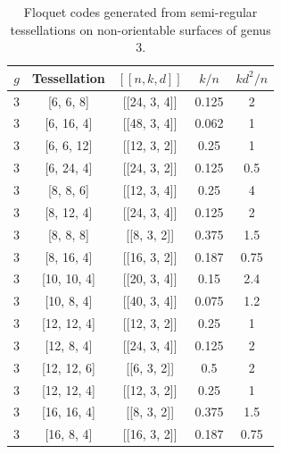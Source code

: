 \documentclass[%
reprint,
amsmath,amssymb,
aps,
]{revtex4-2}
\begin{document}
\begin{table}[b]
	\caption{\label{tab8}
		Floquet codes generated from semi-regular tessellations on non-orientable surfaces of genus $3$.}
	\begin{ruledtabular}
		\begin{tabular}{|c|c|c|c|c|}
			$g$ & Tessellation & $[[n,k,d]]$ & $k/n$ & $kd^{2}/n$ \\ \hline
	3 & [6, 6, 8] & [[24, 3, 4]] & 0.125 & 2  \\
	3 & [6, 16, 4] & [[48, 3, 4]] & 0.062 & 1  \\
	3 & [6, 6, 12] & [[12, 3, 2]] & 0.25 & 1  \\
	3 & [6, 24, 4] & [[24, 3, 2]] & 0.125 & 0.5   \\
	3 & [8, 8, 6] & [[12, 3, 4]] & 0.25 & 4  \\
	3 & [8, 12, 4] & [[24, 3, 4]] & 0.125 & 2  \\
	3 & [8, 8, 8] & [[8, 3, 2]] & 0.375 & 1.5   \\
	3 & [8, 16, 4] & [[16, 3, 2]] & 0.187 & 0.75  \\
	3 & [10, 10, 4] & [[20, 3, 4]] & 0.15 & 2.4  \\
	3 & [10, 8, 4] & [[40, 3, 4]] & 0.075 & 1.2  \\
	3 & [12, 12, 4] & [[12, 3, 2]] & 0.25 & 1  \\
	3 & [12, 8, 4] & [[24, 3, 4]] & 0.125 & 2  \\
	3 & [12, 12, 6] & [[6, 3, 2]] & 0.5 & 2  \\
	3 & [12, 12, 4] & [[12, 3, 2]] & 0.25 & 1  \\
	3 & [16, 16, 4] & [[8, 3, 2]] & 0.375 & 1.5  \\
	3 & [16, 8, 4] & [[16, 3, 2]] & 0.187 & 0.75 \\ 
				\end{tabular}
\end{ruledtabular}
\end{table}
\end{document}
